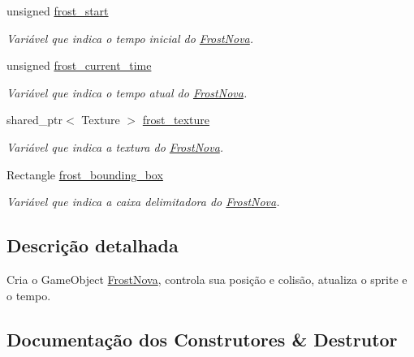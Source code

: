\begin{DoxyCompactItemize}
unsigned \mbox{\hyperlink{classFrostNova_a6d4b037d224fbb3a24e440f0a65ea91f}{frost\+\_\+start}}
\begin{DoxyCompactList}\small\item\em Variável que indica o tempo inicial do \mbox{\hyperlink{classFrostNova}{Frost\+Nova}}. \end{DoxyCompactList}\item 
\mbox{\label{classFrostNova_a0c361e55db3b455ef7f9853827c499e9}} 
unsigned \mbox{\hyperlink{classFrostNova_a0c361e55db3b455ef7f9853827c499e9}{frost\+\_\+current\+\_\+time}}
\begin{DoxyCompactList}\small\item\em Variável que indica o tempo atual do \mbox{\hyperlink{classFrostNova}{Frost\+Nova}}. \end{DoxyCompactList}\item 
\mbox{\label{classFrostNova_a34d5bfebf5d22040885618cc33d8cdee}} 
shared\+\_\+ptr$<$ Texture $>$ \mbox{\hyperlink{classFrostNova_a34d5bfebf5d22040885618cc33d8cdee}{frost\+\_\+texture}}
\begin{DoxyCompactList}\small\item\em Variável que indica a textura do \mbox{\hyperlink{classFrostNova}{Frost\+Nova}}. \end{DoxyCompactList}\item 
\mbox{\label{classFrostNova_afaaeffacf92544fe075ae03eb044b261}} 
Rectangle \mbox{\hyperlink{classFrostNova_afaaeffacf92544fe075ae03eb044b261}{frost\+\_\+bounding\+\_\+box}}
\begin{DoxyCompactList}\small\item\em Variável que indica a caixa delimitadora do \mbox{\hyperlink{classFrostNova}{Frost\+Nova}}. \end{DoxyCompactList}\end{DoxyCompactItemize}


\subsection{Descrição detalhada}
Cria o Game\+Object \mbox{\hyperlink{classFrostNova}{Frost\+Nova}}, controla sua posição e colisão, atualiza o sprite e o tempo. 

\subsection{Documentação dos Construtores \& Destrutor}
\mbox{\label{classFrostNova_aae4bca356b3b1439c74fc259e5fb601d}} 

